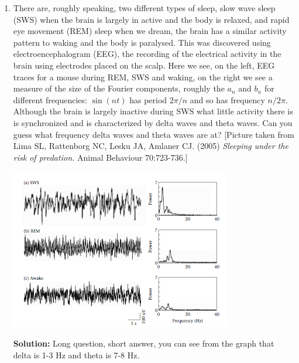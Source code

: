 \documentclass[12pt]{article}
\begin{document}
\begin{enumerate}
\item There are, roughly speaking, two different types of sleep, slow
  wave sleep (SWS) when the brain is largely in active and the body is
  relaxed, and rapid eye movement (REM) sleep when we dream, the brain
  has a similar activity pattern to waking and the body is
  paralysed. This was discovered using electroencephalogram (EEG), the
  recording of the electrical activity in the brain using electrodes
  placed on the scalp. Here we see, on the left, EEG traces for a
  mouse during REM, SWS and waking, on the right we see a measure of
  the size of the Fourier components, roughly the $a_n$ and $b_n$ for
  different frequencies: $\sin(n t)$ has period $2\pi/n$ and so has
  frequency $n/2\pi$. Although the brain is largely inactive during
  SWS what little activity there is is synchronized and is
  characterized by delta waves and theta waves. Can you guess what
  frequency delta waves and theta waves are at? [Picture taken from Lima SL, Rattenborg NC, Lesku JA, Amlaner CJ. (2005) \textsl{Sleeping under the risk of predation.} Animal Behaviour 70:723-736.]  
\begin{center}
\includegraphics{SleepGeneral.png}
\end{center}

\textbf{Solution: } Long question, short answer, you can see from the graph that delta is 1-3 Hz and theta is 7-8 Hz.
\end{enumerate}

 
\end{document}
